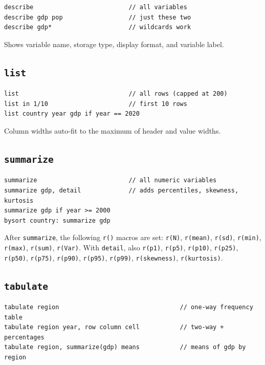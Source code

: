 \documentclass[11pt,letterpaper]{article}
\begin{document}
\begin{lstlisting}
describe                          // all variables
describe gdp pop                  // just these two
describe gdp*                     // wildcards work
\end{lstlisting}

Shows variable name, storage type, display format, and variable label.

\subsection{\texttt{list}}

\begin{lstlisting}
list                              // all rows (capped at 200)
list in 1/10                      // first 10 rows
list country year gdp if year == 2020
\end{lstlisting}

Column widths auto-fit to the maximum of header and value widths.

\subsection{\texttt{summarize}}

\begin{lstlisting}
summarize                         // all numeric variables
summarize gdp, detail             // adds percentiles, skewness, kurtosis
summarize gdp if year >= 2000
bysort country: summarize gdp
\end{lstlisting}

After \texttt{summarize}, the following \texttt{r()} macros are set:
\texttt{r(N)}, \texttt{r(mean)}, \texttt{r(sd)}, \texttt{r(min)},
\texttt{r(max)}, \texttt{r(sum)}, \texttt{r(Var)}.  With \texttt{detail},
also \texttt{r(p1)}, \texttt{r(p5)}, \texttt{r(p10)}, \texttt{r(p25)},
\texttt{r(p50)}, \texttt{r(p75)}, \texttt{r(p90)}, \texttt{r(p95)},
\texttt{r(p99)}, \texttt{r(skewness)}, \texttt{r(kurtosis)}.

\subsection{\texttt{tabulate}}

\begin{lstlisting}
tabulate region                                 // one-way frequency table
tabulate region year, row column cell           // two-way + percentages
tabulate region, summarize(gdp) means           // means of gdp by region
\end{lstlisting}
\end{document}
